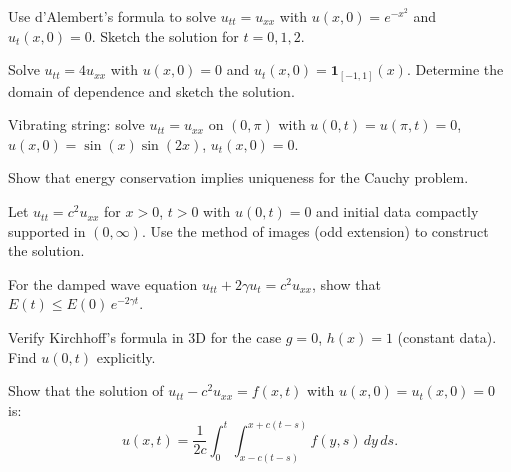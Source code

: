 \begin{exercise}
Use d'Alembert's formula to solve $u_{tt} = u_{xx}$ with
$u(x,0) = e^{-x^2}$ and $u_t(x,0) = 0$. Sketch the solution for
$t = 0, 1, 2$.
\end{exercise}

\begin{exercise}
Solve $u_{tt} = 4u_{xx}$ with $u(x,0) = 0$ and
$u_t(x,0) = \mathbf{1}_{[-1,1]}(x)$. Determine the domain of dependence
and sketch the solution.
\end{exercise}

\begin{exercise}
Vibrating string: solve $u_{tt} = u_{xx}$ on $(0,\pi)$ with
$u(0,t) = u(\pi,t) = 0$, $u(x,0) = \sin(x)\sin(2x)$, $u_t(x,0) = 0$.
\end{exercise}

\begin{exercise}
Show that energy conservation implies uniqueness for the Cauchy problem.
\end{exercise}

\begin{exercise}
Let $u_{tt} = c^2 u_{xx}$ for $x > 0$, $t > 0$ with $u(0,t) = 0$ and
initial data compactly supported in $(0,\infty)$. Use the method of images
(odd extension) to construct the solution.
\end{exercise}

\begin{exercise}
For the damped wave equation $u_{tt} + 2\gamma u_t = c^2 u_{xx}$, show
that $E(t) \leq E(0)\, e^{-2\gamma t}$.
\end{exercise}

\begin{exercise}
Verify Kirchhoff's formula in 3D for the case $g = 0$, $h(x) = 1$
(constant data). Find $u(0,t)$ explicitly.
\end{exercise}

\begin{exercise}
Show that the solution of $u_{tt} - c^2 u_{xx} = f(x,t)$ with
$u(x,0) = u_t(x,0) = 0$ is:
\[
    u(x,t) = \frac{1}{2c}\int_0^t \int_{x-c(t-s)}^{x+c(t-s)} f(y,s)\, dy\, ds.
\]
\end{exercise}
